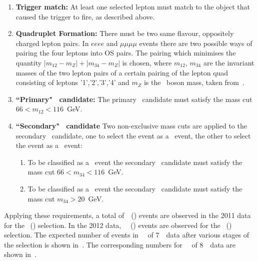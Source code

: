 \begin{enumerate}
    \item {\bf Trigger match:} At least one selected lepton must match to the
    object that caused the trigger to fire, as described above. 

    \item {\bf Quadruplet Formation:} There must be two same flavour,
    oppositely charged lepton pairs. In $eeee$ and $\mu\mu\mu\mu$ events there are
    two possible ways of pairing the four leptons into OS pairs. The pairing which
    minimises the quantity $|m_{12}-m_{Z}|+|m_{34}-m_{Z}|$ is chosen, where
    $m_{12}$, $m_{34}$ are the invariant masses of the two lepton pairs of a certain
    pairing of the lepton quad consisting of leptons '1','2','3','4' and $m_Z$ is
    the \Z\ boson mass, taken from~\cite{PDG}.

    \item {\bf ``Primary" \Z\ candidate:} The primary \Z\ candidate must satisfy the mass cut $66<m_{12}<116$~GeV.

    \item {\bf ``Secondary" \Z\ candidate} Two non-exclusive mass cuts are
    applied to the secondary \Z\ candidate, one
    to select the event as a \ZZ\ event, the other to select the event as a
    \ZZs\ event:
      \begin{enumerate}
     \item To be classified as a \ZZ\ event the secondary \Z\ candidate must satisfy
     the mass cut $66<m_{34}<116$~GeV.
     \item To be classified as a \ZZs\ event the secondary \Z\ candidate
     must satisfy the mass cut $m_{34}>20$~GeV.
    \end{enumerate}

\end{enumerate}

Applying these requirements, a total
of~\ZZSevenTeVNSigEventsObsZZLLLL\ (\ZZSevenTeVNSigEventsObsZZsLLLL) events
are observed in the 2011 data for the \ZZ\ (\ZZs) selection. In the 2012 data, 
~\ZZEightTeVNSigEventsObsZZLLLL\ (\ZZEightTeVNSigEventsObsZZsLLLL) events are
observed for the \ZZ\ (\ZZs) selection. The expected number of events in
\LumiPassGRLTwentyEleven\ \ifb\ of 7~\tev\ data after various stages of the
selection is shown in~. The corresponding numbers for
\LumiPassGRLTwentyTwelve\ \ifb\ of 8~\tev\ data are shown
in~.

